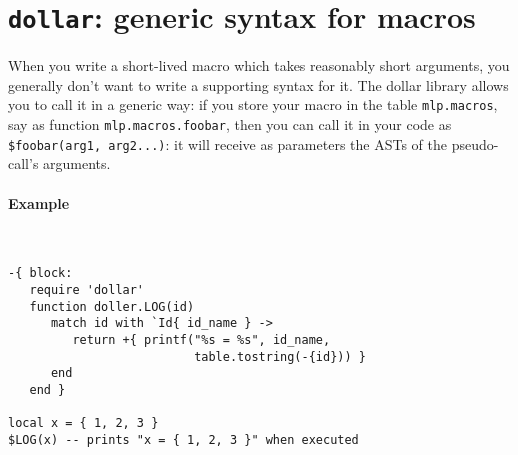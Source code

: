 \section[Dollar extension]{{\tt dollar}: generic syntax for macros}
When you write a short-lived macro which takes reasonably short arguments, you
generally don't want to write a supporting syntax for it. The dollar library
allows you to call it in a generic way: if you store your macro in the table
{\tt mlp.macros}, say as function {\tt mlp.macros.foobar}, then you can call it
in your code as {\tt\$foobar(arg1, arg2...)}: it will receive as parameters the
ASTs of the pseudo-call's arguments.

\paragraph{Example}~
\begin{verbatim}
-{ block:
   require 'dollar'
   function doller.LOG(id)
      match id with `Id{ id_name } -> 
         return +{ printf("%s = %s", id_name, 
                          table.tostring(-{id})) }
      end
   end }

local x = { 1, 2, 3 }
$LOG(x) -- prints "x = { 1, 2, 3 }" when executed
\end{verbatim}
